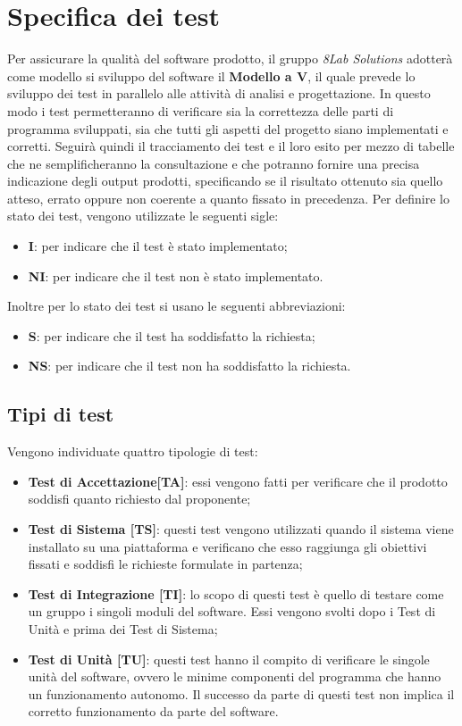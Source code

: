 \section{Specifica dei test}
Per assicurare la qualità del software prodotto, il gruppo \textit{8Lab
Solutions} adotterà come modello si sviluppo del software il
\textbf{Modello a V}, il quale prevede lo sviluppo dei test in parallelo alle
attività di analisi e progettazione. In questo modo i test permetteranno di
verificare sia la correttezza delle parti di programma sviluppati, sia che
tutti gli aspetti del progetto siano implementati e corretti. 
Seguirà quindi il tracciamento dei test e il loro esito per mezzo di tabelle che ne
semplificheranno la consultazione e che potranno fornire una precisa indicazione 
degli output prodotti, specificando se il risultato ottenuto sia quello atteso, errato
oppure non coerente a quanto fissato in precedenza.
Per definire lo stato dei test, vengono utilizzate le seguenti sigle:
\begin{itemize}
	\item \textbf{I}: per indicare che il test è stato implementato;
	\item \textbf{NI}: per indicare che il test non è stato implementato.
\end{itemize}
Inoltre per lo stato dei test si usano le seguenti abbreviazioni:
\begin{itemize}
	\item \textbf{S}: per indicare che il test ha soddisfatto la richiesta;
	\item \textbf{NS}: per indicare che il test non ha soddisfatto la richiesta.
\end{itemize}

\subsection{Tipi di test}
Vengono individuate quattro tipologie di test:
\begin{itemize}
	\item \textbf{Test di Accettazione[TA]}: essi vengono fatti per verificare 
		che il prodotto soddisfi quanto richiesto dal proponente;
	\item \textbf{Test di Sistema [TS]}: questi test vengono utilizzati quando il 
		sistema viene installato su una piattaforma e verificano che esso raggiunga gli 
		obiettivi fissati e soddisfi le richieste formulate in partenza;
	\item \textbf{Test di Integrazione [TI]}: lo scopo di questi test è quello di 
		testare come un gruppo i singoli moduli\glo{} del software. Essi vengono svolti 
		dopo i Test di Unità e prima dei Test di Sistema; 
	\item \textbf{Test di Unità [TU]}: questi test hanno il compito di verificare le 
		singole unità del software, ovvero le minime componenti del programma che hanno 
		un funzionamento autonomo. Il successo da parte di questi test non implica il 
		corretto funzionamento da parte del software.		
\end{itemize}

